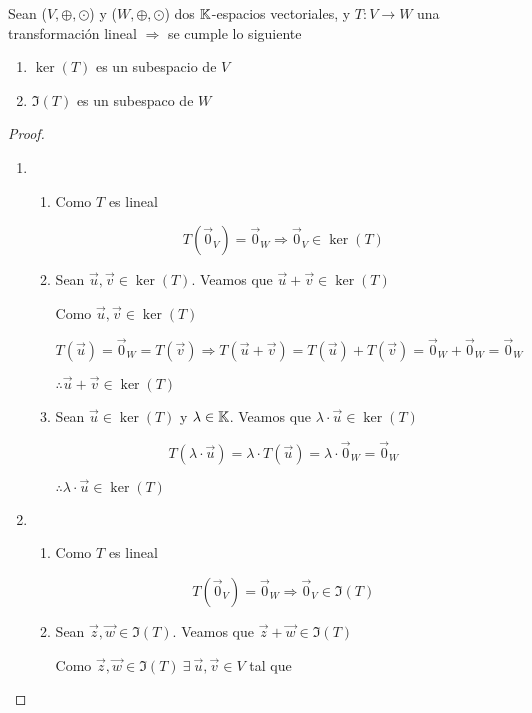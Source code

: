 \begin{theorem}
    Sean ($V, \oplus, \odot$) y ($W, \oplus, \odot$) dos $\mathbb{K}$-espacios vectoriales, y $T : V \to W$ una transformación lineal $\Rightarrow$ se cumple lo siguiente

    \begin{enumerate}
        \item $\ker(T)$ es un subespacio de $V$
        \item $\Im(T)$ es un subespaco de $W$
    \end{enumerate}
\end{theorem}

\begin{proof}    
    \begin{enumerate}
        \item \begin{enumerate}
            \item Como $T$ es lineal

            $$T(\vec{0}_V) = \vec{0}_W \Rightarrow \vec{0}_V \in \ker(T)$$
            \item Sean $\vec{u}, \vec{v} \in \ker(T)$. Veamos que $\vec{u} + \vec{v} \in \ker(T)$

            Como $\vec{u}, \vec{v} \in \ker(T)$

            $$T(\vec{u}) = \vec{0}_W = T(\vec{v}) \Rightarrow T(\vec{u} + \vec{v}) = T(\vec{u}) + T(\vec{v}) = \vec{0}_W + \vec{0}_W  = \vec{0}_W $$

            $\therefore \vec{u} + \vec{v} \in \ker(T)$

            \item Sean $\vec{u} \in \ker(T)$ y $\lambda \in \mathbb{K}$. Veamos que $\lambda \cdot \vec{u} \in \ker(T)$

            $$T(\lambda \cdot \vec{u}) = \lambda \cdot T(\vec{u}) = \lambda \cdot \vec{0}_W = \vec{0}_W$$

            $\therefore \lambda \cdot \vec{u} \in \ker(T)$
        \end{enumerate}
        \item \begin{enumerate}
            \item Como $T$ es lineal 

            $$T(\vec{0}_V) = \vec{0}_W \Rightarrow \vec{0}_V \in \Im(T)$$
            \item Sean $\vec{z}, \vec{w} \in  \Im(T)$. Veamos que $\vec{z} + \vec{w} \in \Im(T)$

            Como $\vec{z}, \vec{w} \in \Im(T) \: \exists \: \vec{u}, \vec{v} \in V$ tal que


\end{enumerate}
\end{enumerate}
\end{proof}
